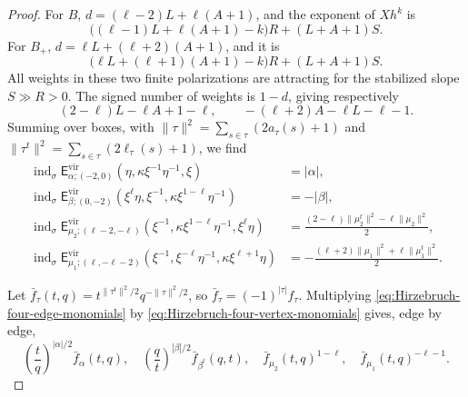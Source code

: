 \documentclass{amsart}
\theoremstyle{definition}
\numberwithin{equation}{section}
\begin{document}
\begin{proof}
For \(B\), \(d=(\ell-2)L+\ell(A+1)\), and the exponent of \(Xh^k\) is
\[
 \bigl((\ell-1)L+\ell(A+1)-k\bigr)R+(L+A+1)S.
\]
For \(B_+\), \(d=\ell L+(\ell+2)(A+1)\), and it is
\[
 \bigl(\ell L+(\ell+1)(A+1)-k\bigr)R+(L+A+1)S.
\]
All weights in these two finite polarizations are attracting for the stabilized slope \(S\gg R>0\).  The signed number of weights is \(1-d\), giving respectively
\[
 (2-\ell)L-\ell A+1-\ell,\qquad
 -(\ell+2)A-\ell L-\ell-1.
\]
Summing over boxes, with \(\|\tau\|^2=\sum_{s\in\tau}(2a_\tau(s)+1)\) and \(\|\tau^t\|^2=\sum_{s\in\tau}(2\ell_\tau(s)+1)\), we find
\begin{equation}
\begin{aligned}
 \operatorname{ind}_\sigma
 \mathsf E^{\mathrm{vir}}_{\alpha;(-2,0)}
 \left(\eta,\kappa\xi^{-1}\eta^{-1},\xi\right)
 &=|\alpha|,\\
 \operatorname{ind}_\sigma
 \mathsf E^{\mathrm{vir}}_{\beta;(0,-2)}
 \left(\xi^\ell\eta,\xi^{-1},
       \kappa\xi^{1-\ell}\eta^{-1}\right)
 &=-|\beta|,\\
 \operatorname{ind}_\sigma
 \mathsf E^{\mathrm{vir}}_{\mu_2;(\ell-2,-\ell)}
 \left(\xi^{-1},\kappa\xi^{1-\ell}\eta^{-1},\xi^\ell\eta\right)
 &=\frac{(2-\ell)\|\mu_2^t\|^2
              -\ell\|\mu_2\|^2}{2},\\
 \operatorname{ind}_\sigma
 \mathsf E^{\mathrm{vir}}_{\mu_1;(\ell,-\ell-2)}
 \left(\xi^{-1},\xi^{-\ell}\eta^{-1},
       \kappa\xi^{\ell+1}\eta\right)
 &=-\frac{(\ell+2)\|\mu_1\|^2
               +\ell\|\mu_1^t\|^2}{2}.
\end{aligned}
\label{eq:Hirzebruch-four-edge-indices}
\end{equation}


Let \(\bar f_\tau(t,q)=t^{\|\tau^t\|^2/2}q^{-\|\tau\|^2/2}\), so \(\bar f_\tau=(-1)^{|\tau|}f_\tau\).  Multiplying \eqref{eq:Hirzebruch-four-edge-monomials} by \eqref{eq:Hirzebruch-four-vertex-monomials} gives, edge by edge,
\begin{equation}
 \left(\frac tq\right)^{|\alpha|/2}\bar f_\alpha(t,q),\quad
 \left(\frac qt\right)^{|\beta|/2}\bar f_{\beta^t}(q,t),\quad
 \bar f_{\mu_2}(t,q)^{1-\ell},\quad
 \bar f_{\mu_1}(t,q)^{-\ell-1}.
\label{eq:Hirzebruch-combined-edge-monomials}
\end{equation}



\end{proof}
\end{document}
